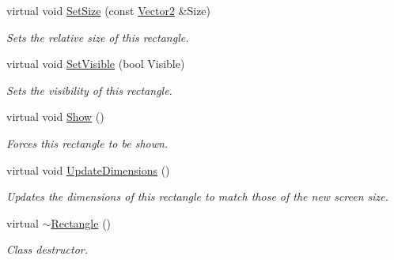 \begin{DoxyCompactItemize}
virtual void \hyperlink{classMezzanine_1_1UI_1_1Rectangle_a1f7a9a5686063b03a254c26a420f458c}{SetSize} (const \hyperlink{classMezzanine_1_1Vector2}{Vector2} \&Size)
\begin{DoxyCompactList}\small\item\em Sets the relative size of this rectangle. \item\end{DoxyCompactList}\item 
virtual void \hyperlink{classMezzanine_1_1UI_1_1Rectangle_adca7d64f834767ac6aa6440920920f36}{SetVisible} (bool Visible)
\begin{DoxyCompactList}\small\item\em Sets the visibility of this rectangle. \item\end{DoxyCompactList}\item 
\hypertarget{classMezzanine_1_1UI_1_1Rectangle_a724c379dadc2743801c9495875d3a93c}{
virtual void \hyperlink{classMezzanine_1_1UI_1_1Rectangle_a724c379dadc2743801c9495875d3a93c}{Show} ()}
\label{classMezzanine_1_1UI_1_1Rectangle_a724c379dadc2743801c9495875d3a93c}

\begin{DoxyCompactList}\small\item\em Forces this rectangle to be shown. \item\end{DoxyCompactList}\item 
virtual void \hyperlink{classMezzanine_1_1UI_1_1Rectangle_a86d759d43ec0c1d429c572a782405e8c}{UpdateDimensions} ()
\begin{DoxyCompactList}\small\item\em Updates the dimensions of this rectangle to match those of the new screen size. \item\end{DoxyCompactList}\item 
\hypertarget{classMezzanine_1_1UI_1_1Rectangle_a1c2a466100f36a45c7ed2f85f0a9e269}{
virtual \hyperlink{classMezzanine_1_1UI_1_1Rectangle_a1c2a466100f36a45c7ed2f85f0a9e269}{$\sim$Rectangle} ()}
\label{classMezzanine_1_1UI_1_1Rectangle_a1c2a466100f36a45c7ed2f85f0a9e269}

\begin{DoxyCompactList}\small\item\em Class destructor. \item\end{DoxyCompactList}\end{DoxyCompactItemize}
